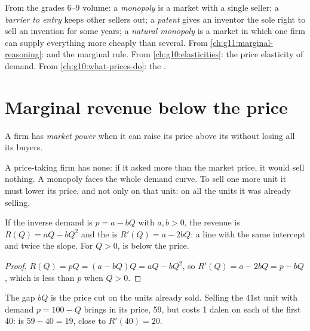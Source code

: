 \begin{recall}
From the grades 6--9 volume: a \emph{monopoly} is a market with a single seller; a \emph{barrier to entry} keeps other sellers out; a \emph{patent} gives an inventor
the sole right to sell an invention for some years; a \emph{natural monopoly} is a market in which one firm can supply everything more cheaply than several. From
\cref{ch:g11:marginal-reasoning}:  and the marginal rule. From \cref{ch:g10:elasticities}: the price elasticity of demand. From
\cref{ch:g10:what-prices-do}: the .
\end{recall}

\section{Marginal revenue below the price}\label{sec:g11:monopoly:mr}

\begin{definition}\label{def:g11:monopoly:market-power}
A firm has \emph{market power} when it can raise its price above its  without losing all its buyers.
\end{definition}

A price-taking firm has none: if it asked more than the market price, it would sell nothing. A monopoly faces the whole demand curve. To sell one more unit it
must lower its price, and not only on that unit: on all the units it was already selling.

\begin{proposition}\label{prop:g11:monopoly:mr-line}
If the inverse demand is $p = a - bQ$ with $a, b > 0$, the revenue is $R(Q) = aQ - bQ^2$ and the  is $R'(Q) = a - 2bQ$: a line with the same
intercept and twice the slope. For $Q > 0$,  is below the price.
\end{proposition}
\begin{proof}
$R(Q) = pQ = (a - bQ)Q = aQ - bQ^2$, so $R'(Q) = a - 2bQ = p - bQ$, which is less than $p$ when $Q > 0$.
\end{proof}

The gap $bQ$ is the price cut on the units already sold. Selling the 41st unit with demand $p = 100 - Q$ brings in its price, 59, but costs 1 dalen on each of the
first 40:  is $59 - 40 = 19$, close to $R'(40) = 20$.

